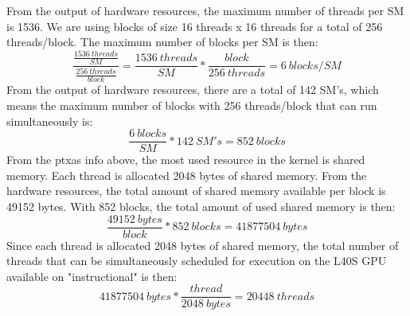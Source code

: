 \documentclass{article}
\begin{document}
\begin{enumerate}
	From the output of hardware resources, the maximum number of threads per SM is 1536. We are using blocks of size 16 threads x 16 threads for a total of 256 threads/block. The maximum number of blocks per SM is then:
	\[\frac{\frac{1536 \ threads}{SM}}{\frac{256 \ threads}{block}}=\frac{1536 \ threads}{SM} * \frac{block}{256 \ threads}=6 \ blocks/SM\]
	From the output of hardware resources, there are a total of 142 SM's, which means the maximum number of blocks with 256 threads/block that can run simultaneously is:
	\[\frac{6 \ blocks}{SM}*142 \ SM's=852 \ blocks\]
	From the ptxas info above, the most used resource in the kernel is shared memory. Each thread is allocated 2048 bytes of shared memory. From the hardware resources, the total amount of shared memory available per block is 49152 bytes. With 852 blocks, the total amount of used shared memory is then:
	\[\frac{49152 \ bytes}{block}*852 \ blocks=41877504 \ bytes\]
	Since each thread is allocated 2048 bytes of shared memory, the total number of threads that can be simultaneously scheduled for execution on the L40S GPU available on "instructional" is then:
	\[41877504 \ bytes*\frac{thread}{2048 \ bytes}=20448 \ threads\]
\end{enumerate}
\end{document}
